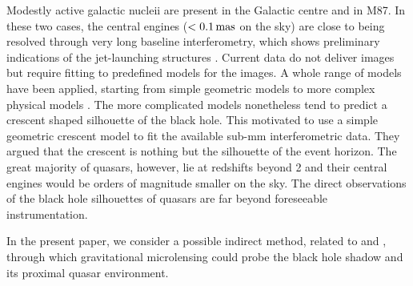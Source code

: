 \documentclass[usenatbib]{mn2e}
\begin{document}
Modestly active galactic nucleii are present in the Galactic centre
and in M87.  In these two cases, the central engines ($<0.1\rm\,mas$
on the sky) are close to being resolved through very long baseline
interferometry, which shows preliminary indications of the
jet-launching structures
\citep{2008JPhCS.131a2055D,2012Sci...338..355D,2016ApJ...820...90F}.
Current data do not deliver images but require fitting to predefined
models for the images.  A whole range of models have been applied,
starting from simple geometric models to more complex physical models
\citep{2008Natur.455...78D,2011ApJ...738...38B,2009ApJ...706..497M,2010ApJ...717.1092D}.
The more complicated models nonetheless tend to predict a crescent
shaped silhouette of the black hole.  This motivated
\cite{2013MNRAS.434..765K} to use a simple geometric crescent model to
fit the available sub-mm interferometric data. They argued that the
crescent is nothing but the silhouette of the event horizon.
The great majority of quasars, however, lie at redshifts beyond 2
\citep{2014A&A...563A..54P} and their central engines would be orders
of magnitude smaller on the sky. The direct observations of the black
hole silhouettes of quasars are far beyond foreseeable
instrumentation.

In the present paper, we consider a possible indirect method, related
to \cite{1999ApJ...524...49A} and \cite{2015ApJ...814L..26M}, 
through which gravitational
microlensing could probe the black hole shadow and its proximal quasar
environment.

\end{document}
